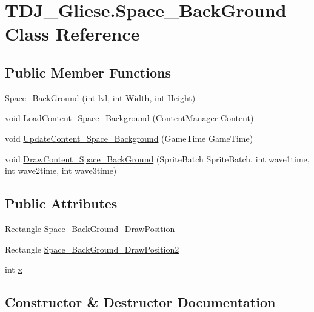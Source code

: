 \hypertarget{class_t_d_j___gliese_1_1_space___back_ground}{}\section{T\+D\+J\+\_\+\+Gliese.\+Space\+\_\+\+Back\+Ground Class Reference}
\label{class_t_d_j___gliese_1_1_space___back_ground}
\subsection*{Public Member Functions}
\begin{DoxyCompactItemize}
\item 
\hyperlink{class_t_d_j___gliese_1_1_space___back_ground_a9a423cf297fdf4265951a0e705ff388a}{Space\+\_\+\+Back\+Ground} (int lvl, int Width, int Height)
\item 
void \hyperlink{class_t_d_j___gliese_1_1_space___back_ground_a5bee00adfa563ff464230017de22e962}{Load\+Content\+\_\+\+Space\+\_\+\+Background} (Content\+Manager Content)
\item 
void \hyperlink{class_t_d_j___gliese_1_1_space___back_ground_a194241837c3c581f41612c1cc549ffb5}{Update\+Content\+\_\+\+Space\+\_\+\+Background} (Game\+Time Game\+Time)
\item 
void \hyperlink{class_t_d_j___gliese_1_1_space___back_ground_a309a58a971832cb0f31b54a8b4e83d8b}{Draw\+Content\+\_\+\+Space\+\_\+\+Back\+Ground} (Sprite\+Batch Sprite\+Batch, int wave1time, int wave2time, int wave3time)
\end{DoxyCompactItemize}
\subsection*{Public Attributes}
\begin{DoxyCompactItemize}
\item 
Rectangle \hyperlink{class_t_d_j___gliese_1_1_space___back_ground_a3bf48cae885cd1216a0932268bd51375}{Space\+\_\+\+Back\+Ground\+\_\+\+Draw\+Position}
\item 
Rectangle \hyperlink{class_t_d_j___gliese_1_1_space___back_ground_a5a0a72790a8de2dcc38160d7f2198a44}{Space\+\_\+\+Back\+Ground\+\_\+\+Draw\+Position2}
\item 
int \hyperlink{class_t_d_j___gliese_1_1_space___back_ground_a2dfcb90af32f452fd848a9071483dc3e}{x}
\end{DoxyCompactItemize}


\subsection{Constructor \& Destructor Documentation}
\mbox{\label{class_t_d_j___gliese_1_1_space___back_ground_a9a423cf297fdf4265951a0e705ff388a}} 
